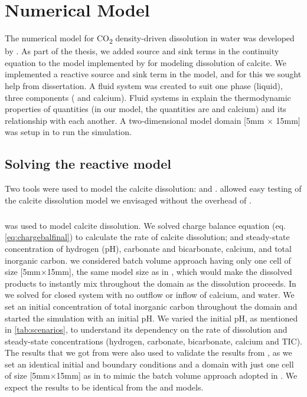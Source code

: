 \chapter{Numerical Model}\label{chapter:modelconcept}
\thispagestyle{empty}

The numerical model for CO\textsubscript{2} density-driven dissolution in water was developed by \citet{Class2020}. As part of the thesis, we added source and sink terms in the continuity equation to the  model implemented by \citet{Class2020} for modeling dissolution of calcite. We implemented a reactive source and sink term in the model, and for this we sought help from \citet{hommel2016modeling} dissertation. A fluid system was created to suit one phase (liquid), three components ( and calcium). Fluid systems in \DuMuX explain the thermodynamic properties of quantities (in our model, the quantities are  and calcium) and its relationship with each another. A two-dimensional model domain [5mm $\times$ 15mm] was setup in \DuMuX to run the simulation.

\section{Solving the reactive model}
Two tools were used to model the calcite dissolution: \MATLAB and \DuMuX. \MATLAB allowed easy testing of the calcite dissolution model we envisaged without the overhead of \DuMuX.

\paragraph*{\MATLAB} was used to model calcite dissolution. We solved charge balance equation (eq. \ref{eq:chargebalfinal}) to calculate the rate of calcite dissolution; and steady-state concentration of hydrogen (pH), carbonate and bicarbonate, calcium, and total inorganic carbon. we considered batch volume approach having only one cell of size [5mm$\times$15mm], the same model size as in \DuMuX, which would make the dissolved products to instantly mix throughout the domain as the dissolution proceeds. In \MATLAB we solved for closed system with no outflow or inflow of calcium,  and water. We set an initial concentration of total inorganic carbon throughout the domain and started the simulation with an initial pH. We varied the initial pH, as mentioned in \cref{tab:scenarios}, to understand its dependency on the rate of dissolution and steady-state concentrations (hydrogen, carbonate, bicarbonate, calcium and TIC). The results that we got from \MATLAB were also used to validate the results from \DuMuX, as we set an identical initial and boundary conditions and a domain with just one cell of size [5mm$\times$15mm] as in \DuMuX to mimic the batch volume approach adopted in \MATLAB. We expect the results to be identical from the \MATLAB and \DuMuX models. \\

